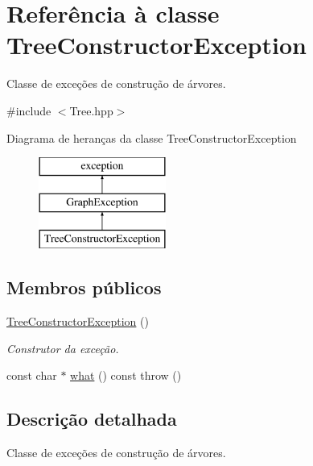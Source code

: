 \hypertarget{classTreeConstructorException}{}\section{Referência à classe Tree\+Constructor\+Exception}
\label{classTreeConstructorException}


Classe de exceções de construção de árvores.  




{\ttfamily \#include $<$Tree.\+hpp$>$}

Diagrama de heranças da classe Tree\+Constructor\+Exception\begin{figure}[H]
\begin{center}
\leavevmode
\includegraphics[height=3.000000cm]{classTreeConstructorException}
\end{center}
\end{figure}
\subsection*{Membros públicos}
\begin{DoxyCompactItemize}
\item 
\mbox{\label{classTreeConstructorException_a2ecb31ba568ce3480ef9db767468f310}} 
\mbox{\hyperlink{classTreeConstructorException_a2ecb31ba568ce3480ef9db767468f310}{Tree\+Constructor\+Exception}} ()
\begin{DoxyCompactList}\small\item\em Construtor da exceção. \end{DoxyCompactList}\item 
const char $\ast$ \mbox{\hyperlink{classTreeConstructorException_acc8b569a2ad401614e1d8a9f6b0bd5d8}{what}} () const  throw ()
\end{DoxyCompactItemize}


\subsection{Descrição detalhada}
Classe de exceções de construção de árvores. 

